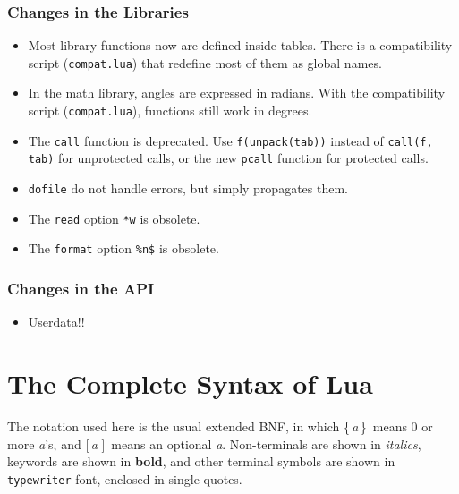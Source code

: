 \documentclass[11pt,twoside]{article}
\newcommand{\C}[1]{}
\renewcommand{\rep}[1]{{\rm\{}\,#1\,{\rm\}}}
\renewcommand{\opt}[1]{{\rm [}\,#1\,{\,\rm]}}
\begin{document}
\subsubsection*{Changes in the Libraries}
\begin{itemize}

\item
Most library functions now are defined inside tables.
There is a compatibility script (\verb|compat.lua|) that
redefine most of them as global names.

\item
In the math library, angles are expressed in radians.
With the compatibility script (\verb|compat.lua|),
functions still work in degrees.

\item
The \verb|call| function is deprecated.
Use \verb|f(unpack(tab))| instead of \verb|call(f, tab)|
for unprotected calls,
or the new \verb|pcall| function for protected calls.

\item
\verb|dofile| do not handle errors, but simply propagates them.

\item
The \verb|read| option \verb|*w| is obsolete.

\item
The \verb|format| option \verb|%n$| is obsolete.

\end{itemize}


\subsubsection*{Changes in the API}
\begin{itemize}

\item
Userdata!!

\end{itemize}



\C{[===============================================================}
\newpage
\section*{The Complete Syntax of Lua} \label{BNF}

The notation used here is the usual extended BNF,
in which
\rep{\emph{a}}~means 0 or more \emph{a}'s, and
\opt{\emph{a}}~means an optional \emph{a}.
Non-terminals are shown in \emph{italics},
keywords are shown in {\bf bold},
and other terminal symbols are shown in {\tt typewriter} font,
enclosed in single quotes.
\end{document}
